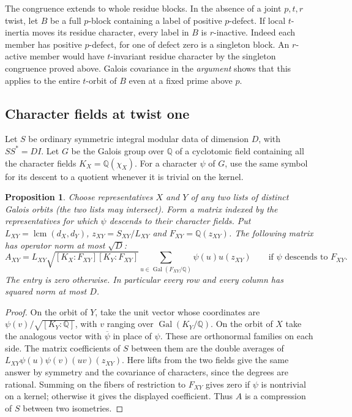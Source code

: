 \documentclass[11pt,a4paper]{article}
\numberwithin{equation}{section}
\newtheorem{proposition}[theorem]{Proposition}
\theoremstyle{remark}
\begin{document}
The congruence extends to whole residue blocks. In the absence of a
joint $p,t,r$ twist, let $B$ be a full $p$-block containing a label
of positive $p$-defect. If local $t$-inertia moves its residue
character, every label in $B$ is $r$-inactive. Indeed each member
has positive $p$-defect, for one of defect zero is a singleton block.
An $r$-active member would have $t$-invariant residue character by
the singleton congruence proved above. Galois covariance in the
\emph{argument} shows that this applies to the entire $t$-orbit
of $B$ even at a fixed prime above $p$.

\subsection{Character fields at twist one}\label{found:J:6}
Let $S$ be ordinary symmetric integral modular data of dimension $D$,
with $SS^*=DI$. Let $G$ be the Galois group over $\mathbb Q$ of a cyclotomic field
containing all the character fields $K_X=\mathbb Q(\chi_X)$. For a character
$\psi$ of $G$, use the same symbol for its descent to a quotient whenever
it is trivial on the kernel.

\begin{proposition}\label{found:J:6.1}\label{found:J:key:new:fourierblock}
Choose representatives $X$ and $Y$ of any two lists of distinct
Galois orbits (the two lists may intersect). Form a matrix indexed by
the representatives for which $\psi$ descends to their character fields.
Put $L_{XY}=\operatorname{lcm}(d_X,d_Y)$, $z_{XY}=S_{XY}/L_{XY}$ and
$F_{XY}=\mathbb Q(z_{XY})$. The following matrix has operator norm
at most $\sqrt D$:
\[
 A_{XY}=
 L_{XY}\sqrt{[K_X:F_{XY}][K_Y:F_{XY}]}
 \sum_{u\in\operatorname{Gal}(F_{XY}/\mathbb Q)}
       \psi(u)u(z_{XY})
 \qquad\text{if $\psi$ descends to $F_{XY}$}.
\]
The entry is zero otherwise. In particular every row and every column
has squared norm at most $D$.
\end{proposition}

\begin{proof}
On the orbit of $Y$, take the unit vector whose coordinates are
$\psi(v)/\sqrt{[K_Y:\mathbb Q]}$, with $v$ ranging over
$\operatorname{Gal}(K_Y/\mathbb Q)$. On the orbit of $X$ take the
analogous vector with $\overline\psi$ in place of $\psi$. These are
orthonormal families on each side. The matrix coefficients of $S$
between them are the double averages of
$L_{XY}\psi(u)\psi(v)(uv)(z_{XY})$. Here lifts from the two
fields give the same answer by symmetry and the covariance of
characters, since the degrees are rational. Summing on the fibers
of restriction to $F_{XY}$ gives zero if $\psi$ is nontrivial on
a kernel; otherwise it gives the displayed coefficient. Thus $A$
is a compression of $S$ between two isometries.
\end{proof}
\end{document}
